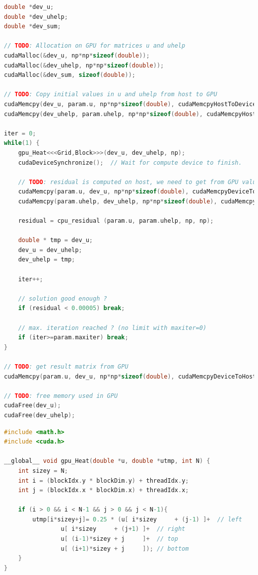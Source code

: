 \documentclass[titlepage]{article}
\begin{document}
\begin{lstlisting}[style=c, language=C, caption=CUDA code run in the Host, captionpos=b]
double *dev_u;
double *dev_uhelp;
double *dev_sum;

// TODO: Allocation on GPU for matrices u and uhelp
cudaMalloc(&dev_u, np*np*sizeof(double));
cudaMalloc(&dev_uhelp, np*np*sizeof(double));
cudaMalloc(&dev_sum, sizeof(double));

// TODO: Copy initial values in u and uhelp from host to GPU
cudaMemcpy(dev_u, param.u, np*np*sizeof(double), cudaMemcpyHostToDevice);
cudaMemcpy(dev_uhelp, param.uhelp, np*np*sizeof(double), cudaMemcpyHostToDevice);

iter = 0;
while(1) {
    gpu_Heat<<<Grid,Block>>>(dev_u, dev_uhelp, np);
    cudaDeviceSynchronize();  // Wait for compute device to finish.

    // TODO: residual is computed on host, we need to get from GPU values computed in u and uhelp
    cudaMemcpy(param.u, dev_u, np*np*sizeof(double), cudaMemcpyDeviceToHost);
    cudaMemcpy(param.uhelp, dev_uhelp, np*np*sizeof(double), cudaMemcpyDeviceToHost);

    residual = cpu_residual (param.u, param.uhelp, np, np);

    double * tmp = dev_u;
    dev_u = dev_uhelp;
    dev_uhelp = tmp;

    iter++;

    // solution good enough ?
    if (residual < 0.00005) break;

    // max. iteration reached ? (no limit with maxiter=0)
    if (iter>=param.maxiter) break;
}

// TODO: get result matrix from GPU
cudaMemcpy(param.u, dev_u, np*np*sizeof(double), cudaMemcpyDeviceToHost);

// TODO: free memory used in GPU
cudaFree(dev_u);
cudaFree(dev_uhelp);
\end{lstlisting}

\begin{lstlisting}[style=c, language=C, caption=CUDA kernel run in the device, captionpos=b]
#include <math.h>
#include <cuda.h>

__global__ void gpu_Heat(double *u, double *utmp, int N) {
    int sizey = N;
    int i = (blockIdx.y * blockDim.y) + threadIdx.y;
    int j = (blockIdx.x * blockDim.x) + threadIdx.x;

    if (i > 0 && i < N-1 && j > 0 && j < N-1){
        utmp[i*sizey+j]= 0.25 * (u[ i*sizey     + (j-1) ]+  // left
                u[ i*sizey     + (j+1) ]+  // right
                u[ (i-1)*sizey + j     ]+  // top
                u[ (i+1)*sizey + j     ]); // bottom
    }
}
\end{lstlisting}
\end{document}
